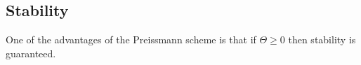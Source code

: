 \subsection{Stability} \label{stability}

One of the advantages of the Preissmann scheme is that if $\Theta \geq 0$ then stability is guaranteed. 
